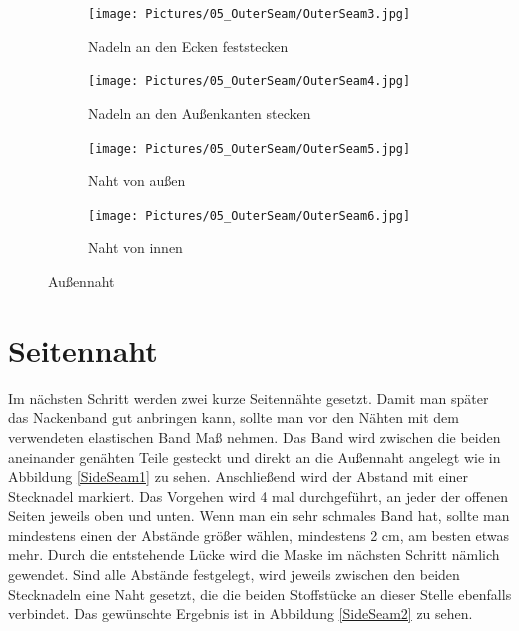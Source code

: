 \documentclass[12pt,parskip=full]{scrartcl}
\begin{document}
\begin{figure}[ht]
    \vspace{0.5cm}
    \centering
    \begin{subfigure}{0.48\textwidth}
        \centering
        \texttt{[image: Pictures/05\_OuterSeam/OuterSeam3.jpg]}
        \caption{Nadeln an den Ecken feststecken}
        \label{OuterSeam3}
    \end{subfigure}
    \begin{subfigure}{0.48\textwidth}
        \centering
        \texttt{[image: Pictures/05\_OuterSeam/OuterSeam4.jpg]}
        \caption{Nadeln an den Außenkanten stecken}
        \label{OuterSeam4}
    \end{subfigure}
    \begin{subfigure}{0.48\textwidth}
        \centering
        \texttt{[image: Pictures/05\_OuterSeam/OuterSeam5.jpg]}
        \caption{Naht von außen}
        \label{OuterSeam5}
    \end{subfigure}
    \begin{subfigure}{0.48\textwidth}
        \centering
        \texttt{[image: Pictures/05\_OuterSeam/OuterSeam6.jpg]}
        \caption{Naht von innen}
        \label{OuterSeam6}
    \end{subfigure}
    \caption{Außennaht}
    \label{OuterSeamSecond}
\end{figure}


\section{Seitennaht}
Im nächsten Schritt werden zwei kurze Seitennähte gesetzt. Damit man später das Nackenband gut anbringen kann, sollte man vor den Nähten mit dem verwendeten elastischen Band Maß nehmen. Das Band wird zwischen die beiden aneinander genähten Teile gesteckt und direkt an die Außennaht angelegt wie in Abbildung \ref{SideSeam1} zu sehen. Anschließend wird der Abstand mit einer Stecknadel markiert. Das Vorgehen wird 4 mal durchgeführt, an jeder der offenen Seiten jeweils oben und unten. Wenn man ein sehr schmales Band hat, sollte man mindestens einen der Abstände größer wählen, mindestens 2 cm, am besten etwas mehr. Durch die entstehende Lücke wird die Maske im nächsten Schritt nämlich gewendet. Sind alle Abstände festgelegt, wird jeweils zwischen den beiden Stecknadeln eine Naht gesetzt, die die beiden Stoffstücke an dieser Stelle ebenfalls verbindet. Das gewünschte Ergebnis ist in Abbildung \ref{SideSeam2} zu sehen.
\end{document}
